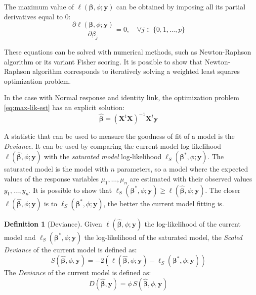 \documentclass[a4paper, nobind]{templates/ociamthesis}
\theoremstyle{definition}
\newtheorem{definition}{Definition}[chapter]
\theoremstyle{definition}
\theoremstyle{definition}
\theoremstyle{remark}
\begin{document}
The maximum value of \(\ell\left(\boldsymbol{\beta}, \phi; \boldsymbol{y}\right)\) can be obtained by imposing all its partial derivatives equal to \(0\):
\[
\frac{\partial \ell\left(\boldsymbol{\beta}, \phi; \boldsymbol{y}\right)}
{\partial\beta_j}
= 0, \quad \forall j\in\{0,1,\dots,p\}
\]

These equations can be solved with numerical methods, such as Newton-Raphson algorithm or its variant Fisher scoring. It is possible to show that Newton-Raphson algorithm corresponds to iteratively solving a weighted least squares optimization problem.

In the case with Normal response and identity link, the optimization problem \eqref{eq:max-lik-est} has an explicit solution:
\[
\hat{\boldsymbol{\beta}} = \left( \boldsymbol{X}^t \boldsymbol{X} \right)^{-1} \boldsymbol{X}^t \boldsymbol{y}
\]

A statistic that can be used to measure the goodness of fit of a model is the \emph{Deviance}. It can be used by comparing the current model log-likelihood \(\ell\left(\hat{\boldsymbol{\beta}}, \phi; \boldsymbol{y}\right)\) with the \emph{saturated model} log-likelihood \(\ell_{S}\left(\boldsymbol{\beta}^*, \phi; \boldsymbol{y}\right)\). The saturated model is the model with \(n\) parameters, so a model where the expected values of the response variables \(\mu_1, \dots, \mu_n\) are estimated with their observed values \(y_1, \dots, y_n\). It is possible to show that \(\ell_{S}\left(\boldsymbol{\beta}^*, \phi; \boldsymbol{y}\right) \ge \ell\left(\hat{\boldsymbol{\beta}}, \phi; \boldsymbol{y}\right)\). The closer \(\ell\left(\hat{\boldsymbol{\beta}}, \phi; \boldsymbol{y}\right)\) is to \(\ell_{S}\left(\boldsymbol{\beta}^*, \phi; \boldsymbol{y}\right)\), the better the current model fitting is.

\begin{definition}[Deviance]
\label{def:deviance-def} \iffalse (Deviance) \fi{} Given \(\ell\left(\hat{\boldsymbol{\beta}}, \phi; \boldsymbol{y}\right)\) the log-likelihood of the current model and \(\ell_{S}\left(\boldsymbol{\beta}^*, \phi; \boldsymbol{y}\right)\) the log-likelihood of the saturated model, the \textit{Scaled Deviance} of the current model is defined as:
\[
S(\hat{\boldsymbol{\beta}}, \phi, \boldsymbol{y}) =
-2\left(
\ell\left(\hat{\boldsymbol{\beta}}, \phi; \boldsymbol{y}\right)
- \ell_{S}\left(\boldsymbol{\beta}^*, \phi; \boldsymbol{y}\right)
\right)
\]
The \textit{Deviance} of the current model is defined as:
\[
D(\hat{\boldsymbol{\beta}}, \boldsymbol{y}) =
\phi \, S(\hat{\boldsymbol{\beta}}, \phi, \boldsymbol{y})
\]
\end{definition}
\end{document}
